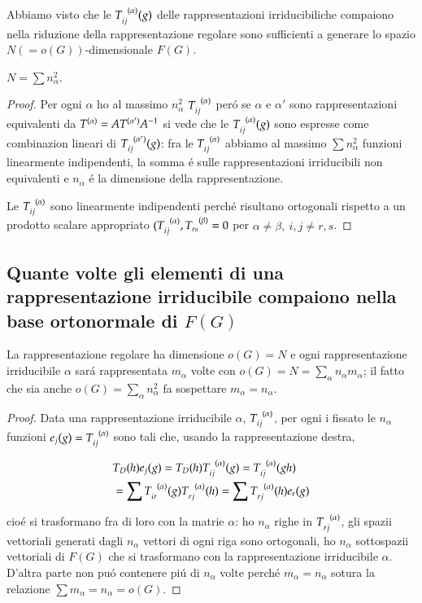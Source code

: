 \documentclass[oneside,12pt]{memoir}
\begin{document}
Abbiamo visto che le $T\indices{_i_j^{(\alpha)}}(g)$ delle rappresentazioni irriducibiliche compaiono nella riduzione della rappresentazione regolare sono sufficienti a generare lo spazio $N(=o(G))$-dimensionale $F(G)$.

$N=\sum n^2_{\alpha}$.

\begin{proof}
Per ogni $\alpha$ ho al massimo $n_{\alpha}^2$ $T\indices{_i_j^{(\alpha)}}$ per\'o se $\alpha$ e $\alpha'$ sono rappresentazioni equivalenti da $T\indices{^{(\alpha)}}=AT\indices{^{(\alpha')}}\invers{A}$ si vede che le $T\indices{_i_j^{(\alpha)}}(g)$ sono espresse come combinazion lineari di $T\indices{_i_j^{(\alpha')}}(g)$: fra le $T\indices{_i_j^{(\alpha)}}$ abbiamo al massimo $\sum n_{\alpha}^2$ funzioni linearmente indipendenti, la somma \'e sulle rappresentazioni irriducibili non equivalenti e $n_{\alpha}$ \'e la dimensione della rappresentazione.

Le $T\indices{_i_j^{(\alpha)}}$ sono linearmente indipendenti perch\'e risultano ortogonali rispetto a un prodotto scalare appropriato $(T\indices{_i_j^{(\alpha)}},T\indices{_r_s^{(\beta)}}=0$ per $\alpha\neq\beta,\ i,j\neq r,s$.
\end{proof}


\subsection{Quante volte gli elementi di una rappresentazione irriducibile compaiono nella base ortonormale di $F(G)$}

La rappresentazione regolare ha dimensione $o(G)=N$ e ogni rappresentazione irriducibile $\alpha$ sar\'a rappresentata $m_{\alpha}$ volte con $o(G)=N=\sum_{\alpha}n_{\alpha}m_{\alpha}$; il fatto che sia anche $o(G)=\sum_{\alpha}n_{\alpha}^2$ fa sospettare $m_{\alpha}=n_{\alpha}$.



\begin{proof}
Data una rappresentazione irriducibile $\alpha$, $T\indices{_i_j^{(\alpha)}}$, per ogni i fissato le $n_{\alpha}$ funzioni $e_j(g)=T\indices{_i_j^{(\alpha)}}$ sono tali che, usando la rappresentazione destra,

\begin{align*}
&T_D(h)e_j(g)=T_D(h)T\indices{_i_j^{(\alpha)}}(g)=T\indices{_i_j^{(\alpha)}}(gh)\\
&=\sum T\indices{_i_r^{(\alpha)}}(g)T\indices{_r_j^{(\alpha)}}(h)=\sum T\indices{_r_j^{(\alpha)}}(h)e_r(g)
\end{align*}

cio\'e si trasformano fra di loro con la matrie $\alpha$: ho $n_{\alpha}$ righe in $T\indices{_r_j^{(\alpha)}}$, gli spazii vettoriali generati dagli $n_{\alpha}$ vettori di ogni riga sono ortogonali, ho $n_{\alpha}$ sottospazii vettoriali di $F(G)$ che si trasformano con la rappresentazione irriducibile $\alpha$. D'altra parte non pu\'o contenere pi\'u di $n_{\alpha}$ volte perch\'e $m_{\alpha}=n_{\alpha}$ sotura la relazione $\sum m_{\alpha}=n_{\alpha}=o(G)$.

\end{proof}
\end{document}
